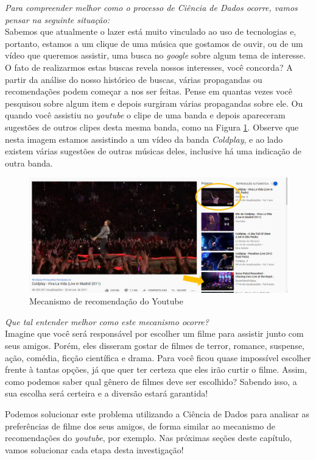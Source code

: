 \documentclass[
  portuguese,
  oneside]{book}
\begin{document}
\emph{Para compreender melhor como o processo de Ciência de Dados ocorre, vamos pensar na seguinte situação:}\\
Sabemos que atualmente o lazer está muito vinculado ao uso de tecnologias e, portanto, estamos a um clique de uma música que gostamos de ouvir, ou de um vídeo que queremos assistir, uma busca no \emph{google} sobre algum tema de interesse. O fato de realizarmos estas buscas revela nossos interesses, você concorda? A partir da análise do nosso histórico de buscas, várias propagandas ou recomendações podem começar a nos ser feitas. Pense em quantas vezes você pesquisou sobre algum item e depois surgiram várias propagandas sobre ele. Ou quando você assistiu no \emph{youtube} o clipe de uma banda e depois apareceram sugestões de outros clipes desta mesma banda, como na Figura \ref{fig:figura3}. Observe que nesta imagem estamos assistindo a um vídeo da banda \emph{Coldplay}, e ao lado existem várias sugestões de outras músicas deles, inclusive há uma indicação de outra banda.

\begin{figure}

{\centering \includegraphics[width=0.8\linewidth]{fig_cap1/youtube} 

}

\caption{Mecanismo de recomendação do Youtube}\label{fig:figura3}
\end{figure}

\emph{Que tal entender melhor como este mecanismo ocorre?}\\
Imagine que você será responsável por escolher um filme para assistir junto com seus amigos. Porém, eles disseram gostar de filmes de terror, romance, suspense, ação, comédia, ficção científica e drama. Para você ficou quase impossível escolher frente à tantas opções, já que quer ter certeza que eles irão curtir o filme. Assim, como podemos saber qual gênero de filmes deve ser escolhido? Sabendo isso, a sua escolha será certeira e a diversão estará garantida!

Podemos solucionar este problema utilizando a Ciência de Dados para analisar as preferências de filme dos seus amigos, de forma similar ao mecanismo de recomendações do \emph{youtube}, por exemplo. Nas próximas seções deste capítulo, vamos solucionar cada etapa desta investigação!
\end{document}
